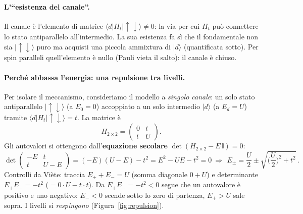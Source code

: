 \documentclass[11pt,a4paper]{article}
\newcommand{\ket}[1]{\lvert #1 \rangle}
\newcommand{\melem}[3]{\langle #1 \vert #2 \vert #3 \rangle}
\newcommand{\up}{\uparrow}
\newcommand{\dn}{\downarrow}
\theoremstyle{definition}
\theoremstyle{remark}
\begin{document}
\paragraph{L'``esistenza del canale''.} Il canale è l'elemento di matrice $\melem{d}{H_t}{\up\dn}\neq0$:
la via per cui $H_t$ può connettere lo stato antiparallelo all'intermedio. La sua esistenza fa sì che il
fondamentale non sia $\ket{\up\dn}$ puro ma acquisti una piccola ammixtura di $\ket{d}$ (quantificata sotto).
Per spin paralleli quell'elemento è nullo (Pauli vieta il salto): il canale è chiuso.

\paragraph{Perché abbassa l'energia: una repulsione tra livelli.} Per isolare il meccanismo, consideriamo
il modello a \emph{singolo canale}: un solo stato antiparallelo $\ket{\up\dn}$ (a $E_0=0$) accoppiato a un
solo intermedio $\ket{d}$ (a $E_d=U$) tramite $\melem{d}{H_t}{\up\dn}=t$. La matrice è
\begin{equation}
H_{2\times2}=\begin{pmatrix} 0 & t\\ t & U\end{pmatrix}.
\label{eq:H2x2}
\end{equation}
Gli autovalori si ottengono dall'\textbf{equazione secolare} $\det(H_{2\times2}-E\,\mathbb{I})=0$:
\begin{equation}
\det\begin{pmatrix} -E & t\\ t & U-E\end{pmatrix}=(-E)(U-E)-t^2=E^2-UE-t^2=0
\ \Longrightarrow\
\boxed{\,E_\pm=\frac{U}{2}\pm\sqrt{\Big(\frac{U}{2}\Big)^2+t^2}\,}.
\label{eq:Epm}
\end{equation}
Controlli da Vi\`ete: traccia $E_++E_-=U$ (somma diagonale $0+U$) e determinante $E_+E_-=-t^2$
($=0\cdot U-t\cdot t$). Da $E_+E_-=-t^2<0$ segue che un autovalore è positivo e uno negativo: $E_-<0$
scende sotto lo zero di partenza, $E_+>U$ sale sopra. I livelli si \emph{respingono}
(Figura~\ref{fig:repulsion}).
\end{document}
